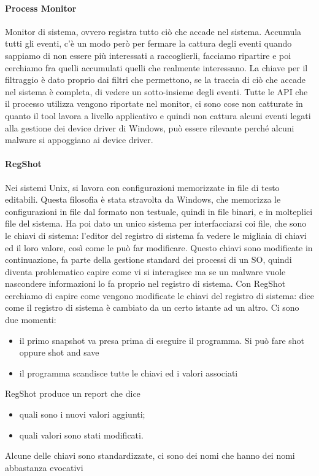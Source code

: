 \documentclass[12pt, oneside]{extbook}
\begin{document}
\paragraph{Process Monitor} Monitor di sistema, ovvero registra tutto ciò che accade nel sistema. Accumula tutti gli eventi, c'è un modo però per fermare la cattura degli eventi quando sappiamo di non essere più interessati a raccoglierli, facciamo ripartire e poi cerchiamo fra quelli accumulati quelli che realmente interessano. La chiave per il filtraggio è dato proprio dai filtri che permettono, se la traccia di ciò che accade nel sistema è completa, di vedere un sotto-insieme degli eventi. Tutte le API che il processo utilizza vengono riportate nel monitor, ci sono cose non catturate in quanto il tool lavora a livello applicativo e quindi non cattura alcuni eventi legati alla gestione dei device driver di Windows, può essere rilevante perché alcuni malware si appoggiano ai device driver.
\\
\paragraph{RegShot} Nei sistemi Unix, si lavora con configurazioni memorizzate in file di testo editabili. Questa filosofia è stata stravolta da Windows, che memorizza le configurazioni in file dal formato non testuale, quindi in file binari, e in molteplici file del sistema. Ha poi dato un unico sistema per interfacciarsi coi file, che sono le chiavi di sistema: l'editor del registro di sistema fa vedere le migliaia di chiavi ed il loro valore, così come le può far modificare. Questo chiavi sono modificate in continuazione, fa parte della gestione standard dei processi di un SO, quindi diventa problematico capire come vi si interagisce ma se un malware vuole nascondere informazioni lo fa proprio nel registro di sistema. Con RegShot cerchiamo di capire come vengono modificate le chiavi del registro di sistema: dice come il registro di sistema è cambiato da un certo istante ad un altro. Ci sono due momenti:
\begin{itemize}
\item il primo snapshot va presa prima di eseguire il programma. Si può fare shot oppure shot and save
\item il programma scandisce tutte le chiavi ed i valori associati
\end{itemize}
RegShot produce un report che dice 
\begin{itemize}
\item quali sono i nuovi valori aggiunti;
\item quali valori sono stati modificati.
\end{itemize}
Alcune delle chiavi sono standardizzate, ci sono dei nomi che hanno dei nomi abbastanza evocativi
\\
\end{document}

